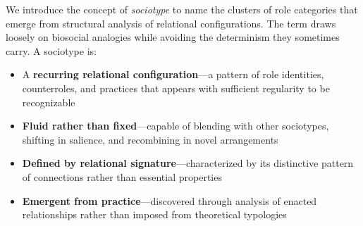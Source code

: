 \documentclass[../main.tex]{subfiles}
\begin{document}
We introduce the concept of \textit{sociotype} to name the clusters of role categories that emerge from structural analysis of relational configurations. The term draws loosely on biosocial analogies while avoiding the determinism they sometimes carry. A sociotype is:

\begin{itemize}
    \item A \textbf{recurring relational configuration}---a pattern of role identities, counterroles, and practices that appears with sufficient regularity to be recognizable
    \item \textbf{Fluid rather than fixed}---capable of blending with other sociotypes, shifting in salience, and recombining in novel arrangements
    \item \textbf{Defined by relational signature}---characterized by its distinctive pattern of connections rather than essential properties
    \item \textbf{Emergent from practice}---discovered through analysis of enacted relationships rather than imposed from theoretical typologies
\end{itemize}
\end{document}
